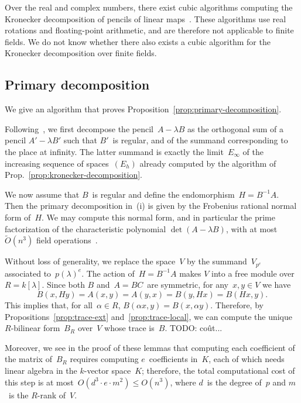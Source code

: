 \documentclass{lms}
\def\todo#1{{\color{orange}TODO: #1}}
\def\Ot{\widetilde{O}}
\begin{document}
Over the real and complex numbers,
there exist cubic algorithms computing the Kronecker decomposition
of pencils of linear maps~\cite{beelen1988improved}.
These algorithms use real rotations and floating-point arithmetic,
and are therefore not applicable to finite fields.
We do not know whether there also exists a cubic algorithm
for the Kronecker decomposition over finite fields.


\subsection{Primary decomposition}
\label{ap:primary}

We give an algorithm that proves
Proposition~\ref{prop:primary-decomposition}.

Following~\cite[Lemma 4.1]{inventiones1976waterhouse},
we first decompose the pencil~$A - λ B$ as the orthogonal sum of
a pencil $A' - λ B'$ such that $B'$~is regular,
and of the summand corresponding to the place at infinity.
The latter summand is exactly
the limit~$E_{∞}$ of the increasing sequence of spaces~$(E_{h})$
already computed by the algorithm of Prop.~\ref{prop:kronecker-decomposition}.

We now assume that $B$~is regular and define the endomorphism~$H = B^{-1} A$.
Then the primary decomposition in~(i) is given by
the Frobenius rational normal form of~$H$.
We may compute this normal form, and in particular
the prime factorization of the characteristic polynomial $\det (A - λ B)$,
with at most~$\Ot(n^3)$ field operations~\cite{kaltoffen11compute}.

\medbreak

Without loss of generality, we replace the space~$V$
by the summand~$V_{p^e}$ associated to~$p(λ)^e$.
The action of~$H = B^{-1} A$ makes $V$ into a free module over~$R = k[λ]$.
Since both $B$ and~$A=BC$~are symmetric, for any~$x, y ∈ V$ we have
\begin{equation}
B(x, H y) = A(x, y) = A(y, x) = B(y, H x) = B(H x, y).
\end{equation}
This implies that, for all~$α ∈ R$, $B(α x, y) = B(x, α y)$.
Therefore, by Propositions~\ref{prop:trace-ext} and~\ref{prop:trace-local},
we can compute the unique $R$-bilinear form~$B_R$ over~$V$ whose trace is~$B$.
\todo{coût...}

Moreover, we see in the proof of these lemmas
that computing each coefficient of the matrix of~$B_R$
requires computing $e$~coefficients in~$K$,
each of which needs linear algebra in the $k$-vector space~$K$;
therefore, the total computational cost of this step
is at most~$O(d^3 · e · m^2) ≤ O(n^3)$,
where $d$~is the degree of~$p$ and $m$~is the $R$-rank of~$V$.
\end{document}

